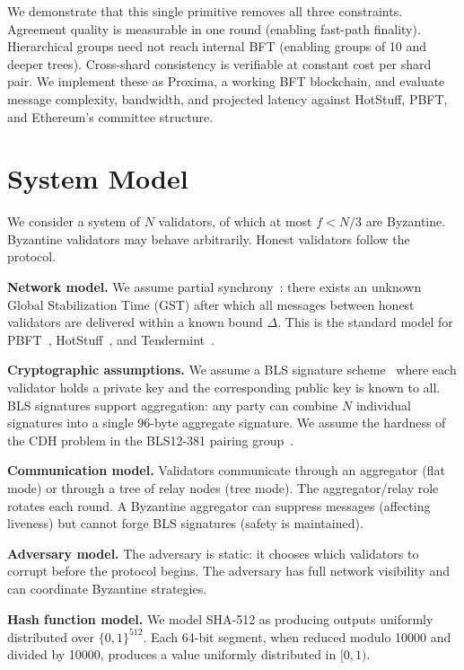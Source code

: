 \documentclass[conference]{IEEEtran}
\begin{document}
We demonstrate that this single primitive removes all three constraints. Agreement quality is measurable in one round (enabling fast-path finality). Hierarchical groups need not reach internal BFT (enabling groups of 10 and deeper trees). Cross-shard consistency is verifiable at constant cost per shard pair. We implement these as Proxima, a working BFT blockchain, and evaluate message complexity, bandwidth, and projected latency against HotStuff, PBFT, and Ethereum's committee structure.

\section{System Model}

We consider a system of $N$ validators, of which at most $f < N/3$ are Byzantine. Byzantine validators may behave arbitrarily. Honest validators follow the protocol.

\textbf{Network model.} We assume partial synchrony~\cite{dwork1988partialsync}: there exists an unknown Global Stabilization Time (GST) after which all messages between honest validators are delivered within a known bound $\Delta$. This is the standard model for PBFT~\cite{castro1999pbft}, HotStuff~\cite{yin2019hotstuff}, and Tendermint~\cite{buchman2016tendermint}.

\textbf{Cryptographic assumptions.} We assume a BLS signature scheme~\cite{boneh2004bls} where each validator holds a private key and the corresponding public key is known to all. BLS signatures support aggregation: any party can combine $N$ individual signatures into a single 96-byte aggregate signature. We assume the hardness of the CDH problem in the BLS12-381 pairing group~\cite{blst}.

\textbf{Communication model.} Validators communicate through an aggregator (flat mode) or through a tree of relay nodes (tree mode). The aggregator/relay role rotates each round. A Byzantine aggregator can suppress messages (affecting liveness) but cannot forge BLS signatures (safety is maintained).

\textbf{Adversary model.} The adversary is static: it chooses which validators to corrupt before the protocol begins. The adversary has full network visibility and can coordinate Byzantine strategies.

\textbf{Hash function model.} We model SHA-512 as producing outputs uniformly distributed over $\{0,1\}^{512}$. Each 64-bit segment, when reduced modulo 10000 and divided by 10000, produces a value uniformly distributed in $[0, 1)$.
\end{document}

